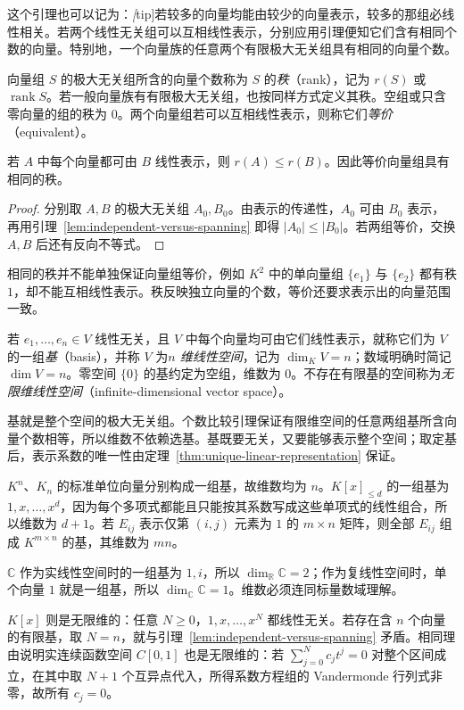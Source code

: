 这个引理也可以记为：\emph[tip]{若较多的向量均能由较少的向量表示，较多的那组必线性相关}。若两个线性无关组可以互相线性表示，分别应用引理便知它们含有相同个数的向量。特别地，一个向量族的任意两个有限极大无关组具有相同的向量个数。

\begin{definition}
\label{def:vector-rank-equivalence}
向量组 $S$ 的极大无关组所含的向量个数称为 $S$ 的\emph{秩}（rank），记为 $r(S)$ 或 $\operatorname{rank}S$。若一般向量族有有限极大无关组，也按同样方式定义其秩。空组或只含零向量的组的秩为 $0$。两个向量组若可以互相线性表示，则称它们\emph{等价}（equivalent）。
\end{definition}

\begin{theorem}
\label{thm:rank-under-representation}
若 $A$ 中每个向量都可由 $B$ 线性表示，则 $r(A)\leq r(B)$。因此等价向量组具有相同的秩。
\end{theorem}

\begin{proof}
分别取 $A,B$ 的极大无关组 $A_0,B_0$。由表示的传递性，$A_0$ 可由 $B_0$ 表示，再用引理~\ref{lem:independent-versus-spanning} 即得 $|A_0|\leq|B_0|$。若两组等价，交换 $A,B$ 后还有反向不等式。
\end{proof}

相同的秩并不能单独保证向量组等价，例如 $K^2$ 中的单向量组 $\{e_1\}$ 与 $\{e_2\}$ 都有秩 $1$，却不能互相线性表示。秩反映独立向量的个数，等价还要求表示出的向量范围一致。

\begin{definition}
\label{def:basis-dimension}
若 $e_1,\ldots,e_n\in V$ 线性无关，且 $V$ 中每个向量均可由它们线性表示，就称它们为 $V$ 的一组\emph{基}（basis），并称 $V$ 为\emph{$n$ 维线性空间}，记为 $\dim_K V=n$；数域明确时简记 $\dim V=n$。零空间 $\{0\}$ 的基约定为空组，维数为 $0$。不存在有限基的空间称为\emph{无限维线性空间}（infinite-dimensional vector space）。
\end{definition}

基就是整个空间的极大无关组。个数比较引理保证有限维空间的任意两组基所含向量个数相等，所以维数不依赖选基。基既要无关，又要能够表示整个空间；取定基后，表示系数的唯一性由定理~\ref{thm:unique-linear-representation} 保证。

\begin{example}
\label{ex:dimensions-of-standard-spaces}
$K^n$、$K_n$ 的标准单位向量分别构成一组基，故维数均为 $n$。$K[x]_{\leq d}$ 的一组基为 $1,x,\ldots,x^d$，因为每个多项式都能且只能按其系数写成这些单项式的线性组合，所以维数为 $d+1$。若 $E_{ij}$ 表示仅第 $(i,j)$ 元素为 $1$ 的 $m\times n$ 矩阵，则全部 $E_{ij}$ 组成 $K^{m\times n}$ 的基，其维数为 $mn$。

$\mathbb C$ 作为实线性空间时的一组基为 $1,i$，所以 $\dim_{\mathbb R}\mathbb C=2$；作为复线性空间时，单个向量 $1$ 就是一组基，所以 $\dim_{\mathbb C}\mathbb C=1$。维数必须连同标量数域理解。

$K[x]$ 则是无限维的：任意 $N\geq0$，$1,x,\ldots,x^N$ 都线性无关。若存在含 $n$ 个向量的有限基，取 $N=n$，就与引理~\ref{lem:independent-versus-spanning} 矛盾。相同理由说明实连续函数空间 $C[0,1]$ 也是无限维的：若 $\sum_{j=0}^N c_jt^j=0$ 对整个区间成立，在其中取 $N+1$ 个互异点代入，所得系数方程组的 Vandermonde 行列式非零，故所有 $c_j=0$。
\end{example}

